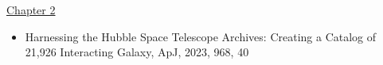 


\begin{pubs}        %
\newif\ifshowcitations\showcitationsfalse%
\newif\ifshowlinks\showlinksfalse%

%
%
%

\ifshowlinks%
  \usepackage[
         colorlinks=true,
         urlcolor=blue,       %
         ]{hyperref}
  \newcommand*{\inspireurl}[1]{\\\href{#1}{INSPIRE-HEP entry}}
\else
  \makeatletter
  \newcommand*{\inspireurl}[1]{\@bsphack\@esphack}
  \makeatother
\fi
\ifshowcitations%
  \newcommand*{\citations}[1]{\\* #1}
\else
  \makeatletter
  \newcommand*{\citations}[1]{\@bsphack\@esphack}
  \makeatother
\fi
\renewcommand{\labelenumii}{\arabic{enumi}.\arabic{enumii}}


%
\underline{Chapter 2}
\begin{itemize}
	\item Harnessing the Hubble Space Telescope Archives: Creating a Catalog of 21,926 Interacting Galaxy, ApJ, 2023, 968, 40
\end{itemize}


\end{pubs}
